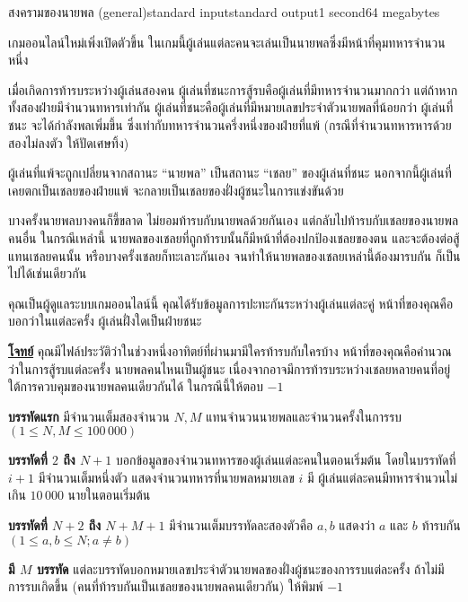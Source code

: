 \documentclass[11pt,a4paper]{article}
\begin{document}
\begin{problem}{สงครามของนายพล (general)}{standard input}{standard output}{1 second}{64 megabytes}

    เกมออนไลน์ใหม่เพิ่งเปิดตัวขึ้น ในเกมนี้ผู้เล่นแต่ละคนจะเล่นเป็นนายพลซึ่งมีหน้าที่คุมทหารจำนวนหนึ่ง
    
    เมื่อเกิดการท้ารบระหว่างผู้เล่นสองคน  ผู้เล่นที่ชนะการสู้รบคือผู้เล่นที่มีทหารจำนวนมากกว่า แต่ถ้าหากทั้งสองฝ่ายมีจำนวนทหารเท่ากัน ผู้เล่นที่ชนะคือผู้เล่นที่มีหมายเลขประจำตัวนายพลที่น้อยกว่า
    ผู้เล่นที่ชนะ จะได้กำลังพลเพิ่มขึ้น ซึ่งเท่ากับทหารจำนวนครึ่งหนึ่งของฝ่ายที่แพ้ (กรณีที่จำนวนทหารหารด้วยสองไม่ลงตัว ให้ปัดเศษทิ้ง)
    
    ผู้เล่นที่แพ้จะถูกเปลี่ยนจากสถานะ “นายพล” เป็นสถานะ “เชลย” ของผู้เล่นที่ชนะ  นอกจากนี้ผู้เล่นที่เคยตกเป็นเชลยของฝ่ายแพ้ จะกลายเป็นเชลยของฝั่งผู้ชนะในการแข่งขันด้วย
    
    บางครั้งนายพลบางคนก็ขี้ขลาด ไม่ยอมท้ารบกับนายพลด้วยกันเอง แต่กลับไปท้ารบกับเชลยของนายพลคนอื่น ในกรณีเหล่านี้ นายพลของเชลยที่ถูกท้ารบนั้นก็มีหน้าที่ต้องปกป้องเชลยของตน และจะต้องต่อสู้แทนเชลยคนนั้น หรือบางครั้งเชลยก็ทะเลาะกันเอง จนทำให้นายพลของเชลยเหล่านี้ต้องมารบกัน ก็เป็นไปได้เช่นเดียวกัน
    
    คุณเป็นผู้ดูแลระบบเกมออนไลน์นี้ คุณได้รับข้อมูลการปะทะกันระหว่างผู้เล่นแต่ละคู่ หน้าที่ของคุณคือบอกว่าในแต่ละครั้ง ผู้เล่นฝั่งใดเป็นฝ่ายชนะ
    

\bigskip
\underline{\textbf{โจทย์}}  คุณมีไฟล์ประวัติว่าในช่วงหนึ่งอาทิตย์ที่ผ่านมามีใครท้ารบกับใครบ้าง หน้าที่ของคุณคือคำนวณว่าในการสู้รบแต่ละครั้ง นายพลคนไหนเป็นผู้ชนะ  เนื่องจากอาจมีการท้ารบระหว่างเชลยหลายคนที่อยู่ใต้การควบคุมของนายพลคนเดียวกันได้ ในกรณีนี้ให้ตอบ $-1$


\InputFile

\textbf{บรรทัดแรก} มีจำนวนเต็มสองจำนวน $N, M$ แทนจำนวนนายพลและจำนวนครั้งในการรบ $(1 \leq N,M \leq 100\,000)$

\textbf{บรรทัดที่ $2$ ถึง $N+1$} บอกข้อมูลของจำนวนทหารของผู้เล่นแต่ละคนในตอนเริ่มต้น โดยในบรรทัดที่ $i+1$ มีจำนวนเต็มหนึ่งตัว แสดงจำนวนทหารที่นายพลหมายเลข $i$ มี ผู้เล่นแต่ละคนมีทหารจำนวนไม่เกิน $10\,000$ นายในตอนเริ่มต้น

\textbf{บรรทัดที่ $N+2$ ถึง $N+M+1$} มีจำนวนเต็มบรรทัดละสองตัวคือ $a,b$ แสดงว่า $a$ และ $b$ ท้ารบกัน\\ $(1 \leq a,b \leq N; a \neq b)$



\OutputFile

\textbf{มี $M$ บรรทัด} แต่ละบรรทัดบอกหมายเลขประจำตัวนายพลของฝั่งผู้ชนะของการรบแต่ละครั้ง ถ้าไม่มีการรบเกิดขึ้น (คนที่ท้ารบกันเป็นเชลยของนายพลคนเดียวกัน) ให้พิมพ์ $-1$


\end{problem}
\end{document}
